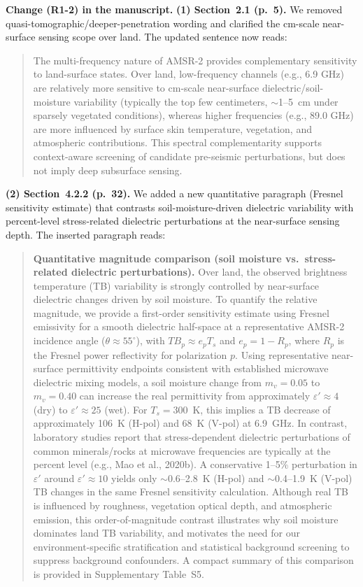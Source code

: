 \documentclass[11pt]{article}
\newcommand{\revchange}[1]{\begingroup\color{changecolor}#1\endgroup}
\begin{document}
\revchange{%
\textbf{Change (R1-2) in the manuscript.}
\textbf{(1) Section~2.1 (p.~5).} We removed quasi-tomographic/deeper-penetration wording and clarified the cm-scale near-surface sensing scope over land. The updated sentence now reads:
\begin{quote}
The multi-frequency nature of AMSR-2 provides complementary sensitivity to land-surface states. Over land, low-frequency channels (e.g., 6.9 GHz) are relatively more sensitive to cm-scale near-surface dielectric/soil-moisture variability (typically the top few centimeters, $\sim$1--5~cm under sparsely vegetated conditions), whereas higher frequencies (e.g., 89.0 GHz) are more influenced by surface skin temperature, vegetation, and atmospheric contributions. This spectral complementarity supports context-aware screening of candidate pre-seismic perturbations, but does not imply deep subsurface sensing.
\end{quote}

\medskip

\textbf{(2) Section~4.2.2 (p.~32).} We added a new quantitative paragraph (Fresnel sensitivity estimate) that contrasts soil-moisture-driven dielectric variability with percent-level stress-related dielectric perturbations at the near-surface sensing depth. The inserted paragraph reads:
\begin{quote}
\textbf{Quantitative magnitude comparison (soil moisture vs.\ stress-related dielectric perturbations).} Over land, the observed brightness temperature (TB) variability is strongly controlled by near-surface dielectric changes driven by soil moisture. To quantify the relative magnitude, we provide a first-order sensitivity estimate using Fresnel emissivity for a smooth dielectric half-space at a representative AMSR-2 incidence angle ($\theta \approx 55^{\circ}$), with $TB_p \approx e_p T_s$ and $e_p = 1 - R_p$, where $R_p$ is the Fresnel power reflectivity for polarization $p$. Using representative near-surface permittivity endpoints consistent with established microwave dielectric mixing models, a soil moisture change from $m_v = 0.05$ to $m_v = 0.40$ can increase the real permittivity from approximately $\varepsilon' \approx 4$ (dry) to $\varepsilon' \approx 25$ (wet). For $T_s = 300$~K, this implies a TB decrease of approximately 106~K (H-pol) and 68~K (V-pol) at 6.9~GHz. In contrast, laboratory studies report that stress-dependent dielectric perturbations of common minerals/rocks at microwave frequencies are typically at the percent level (e.g., Mao et al., 2020b). A conservative 1--5\% perturbation in $\varepsilon'$ around $\varepsilon' \approx 10$ yields only $\sim$0.6--2.8~K (H-pol) and $\sim$0.4--1.9~K (V-pol) TB changes in the same Fresnel sensitivity calculation. Although real TB is influenced by roughness, vegetation optical depth, and atmospheric emission, this order-of-magnitude contrast illustrates why soil moisture dominates land TB variability, and motivates the need for our environment-specific stratification and statistical background screening to suppress background confounders. A compact summary of this comparison is provided in Supplementary Table~S5.
\end{quote}

}
\end{document}
